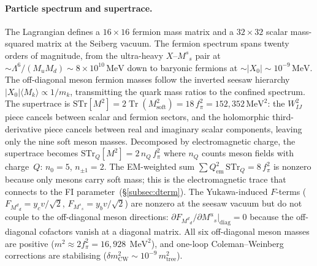 \documentclass[12pt,a4paper]{article}
\newcommand{\MeV}{\,\text{MeV}}
\newcommand{\fpi}{f_\pi}
\begin{document}
\paragraph{Particle spectrum and supertrace.}
The Lagrangian defines a $16\times 16$ fermion mass matrix and a
$32\times 32$ scalar mass-squared matrix at the Seiberg vacuum.
The fermion spectrum spans twenty orders of magnitude, from the
ultra-heavy $X$--$M^s{}_s$ pair at $\sim\Lambda^6/(M_u M_d)
\sim 8\times 10^{10}\MeV$ down to baryonic fermions at
$\sim|X_0| \sim 10^{-9}\MeV$.  The off-diagonal meson fermion
masses follow the inverted seesaw hierarchy $|X_0|\langle M_k\rangle
\propto 1/m_k$, transmitting the quark mass ratios to the
confined spectrum.  The supertrace is
$\text{STr}[M^2] = 2\operatorname{Tr}(M^2_{\text{soft}})
= 18\,\fpi^2 = 152{,}352\MeV^2$:
the $W_{IJ}^2$ piece cancels between scalar and fermion sectors,
and the holomorphic third-derivative piece cancels between real
and imaginary scalar components, leaving only the nine
soft meson masses.
Decomposed by electromagnetic charge, the supertrace
becomes $\text{STr}_Q[M^2] = 2\,n_Q\,\fpi^2$ where $n_Q$
counts meson fields with charge~$Q$: $n_0 = 5$, $n_{\pm 1} = 2$.
The EM-weighted sum $\sum Q_{\text{em}}^2\,\text{STr}_Q = 8\,\fpi^2$
is nonzero because only mesons carry soft mass; this is the
electromagnetic trace that connects to the FI
parameter~(\S\ref{subsec:dterm}).
The Yukawa-induced $F$-terms ($F_{M^d{}_d} = y_c v/\sqrt{2}$,
$F_{M^s{}_s} = y_b v/\sqrt{2}$) are nonzero at the seesaw
vacuum but do not couple to the off-diagonal meson directions:
$\partial F_{M^d{}_d}/\partial M^u{}_s\big|_{\text{diag}} = 0$
because the off-diagonal cofactors vanish at a diagonal matrix.
All six off-diagonal meson masses are positive
($m^2 \approx 2\fpi^2 = 16{,}928\;\MeV^2$),
and one-loop Coleman--Weinberg corrections are stabilising
($\delta m^2_{\text{CW}} \sim 10^{-9}\,m^2_{\text{tree}}$).
\end{document}
